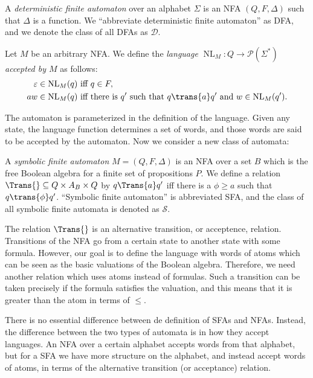 \begin{definition}
A \emph{deterministic finite automaton} over an alphabet $\Sigma$ is an NFA $(Q,F,\Delta)$ such that $\Delta$ is a function. We ``abbreviate deterministic finite automaton'' as DFA, and we denote the class of all DFAs as $\mathcal{D}$.
\end{definition}

\begin{definition}
Let $M$ be an arbitrary NFA. We define the \emph{language} $\operatorname{NL}_M : Q \to \mathcal{P}(\Sigma^*)$ \emph{accepted by $M$} as follows:
\begin{align*}
\varepsilon \in \operatorname{NL}_M(q) &\text{ iff } q \in F, \\
aw \in \operatorname{NL}_M(q) &\text{ iff there is } q' \text{ such that } q \trans{a} q' \text{ and } w \in \operatorname{NL}_M(q').
\end{align*}
\end{definition}

The automaton is parameterized in the definition of the language. Given any state, the language function determines a set of words, and those words are said to be accepted by the automaton. Now we consider a new class of automata:

\begin{definition}
A \emph{symbolic finite automaton} $M = (Q, F, \Delta)$ is an NFA over a set $B$ which is the free Boolean algebra for a finite set of propositions $P$. We define a relation $\Trans{} \subseteq Q \times A_B \times Q$ by
$q \Trans{a} q'$ iff there is a $\phi \ge a$ such that $q \trans{\phi} q'$. ``Symbolic finite automaton'' is abbreviated SFA, and the class of all symbolic finite automata is denoted as $\mathcal{S}$.
\end{definition}

The relation $\Trans{}$ is an alternative transition, or acceptence, relation. Transitions of the NFA go from a certain state to another state with some formula. However, our goal is to define the language with words of atoms which can be seen as the basic valuations of the Boolean algebra. Therefore, we need another relation which uses atoms instead of formulas. Such a transition can be taken precisely if the formula satisfies the valuation, and this means that it is greater than the atom in terms of ${\le}$.

There is no essential difference between de definition of SFAs and NFAs. Instead, the difference between the two types of automata is in how they accept languages. An NFA over a certain alphabet accepts words from that alphabet, but for a SFA we have more structure on the alphabet, and instead accept words of atoms, in terms of the alternative transition (or acceptance) relation.

